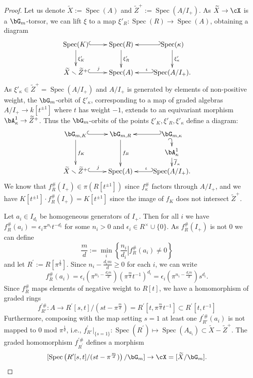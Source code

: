 \documentclass[a4paper]{amsart}
\numberwithin{equation}{section}
\theoremstyle{plain}
\theoremstyle{definition}
\DeclareMathOperator{\Spec}{Spec}
\newcommand{\co}{\colon}
\def\tX{\widetilde{X}}
\def\tZ{\widetilde{Z}}
\begin{document}
\begin{proof}
	Let us denote $\widetilde{X}:=\Spec(A)$ and $\widetilde{Z}^+:=\Spec(A/I_+)$. As $\tX\to \cX$ is a $\bG_m$-torsor, we can lift $\xi$ to a map $\xi'_{R} \co \Spec(R) \to \Spec(A)$, obtaining a diagram
	$$\xymatrix{
		\Spec(K) \ar@{^(->}[r]\ar[d]^{\xi'_K} & \Spec(R)\ar[d]^{\xi'_{R}} & \Spec(\kappa)\ar@{_(->}[l]\ar[d]^{\xi'_{\kappa}} \\
		\tX\smallsetminus\tZ^+ \ar@{^(->}[r]^-{j}& \Spec(A) & \ar@{_(->}[l]_{\iota}\Spec(A/I_+).}$$
	As $\xi'_{\kappa}\in \tZ^+=\Spec(A/I_+)$ and $A/I_+$ is generated by elements of non-positive weight, the $\bG_m$-orbit of $\xi'_{\kappa}$, corresponding to a map of graded algebras $A/I_+ \to k[t^{\pm 1}]$ where $t$ has weight $-1$, extends to an equivariant morphism $\bA^1_{\kappa} \to \tZ^+$. Thus the $\bG_m$-orbits of the points $\xi'_K,\xi'_{R},\xi'_{\kappa}$ define a diagram:
	$$\xymatrix@R=10pt{
		\bG_{m,K} \ar@{^(->}[r]\ar[dd]^{f_K} & \bG_{m,R} \ar[dd]^{f_R} & \bG_{m,{\kappa}}\ar@{_(->}[l]\ar@{_(->}[d] \\
		& & \bA^1_{\kappa} \ar[d]^{\overline{f}_{\kappa}} \\
		\tX\smallsetminus \tZ^+ \ar@{^(->}[r]^-{j}& \Spec(A) & \ar@{_(->}[l]_{\iota}\Spec(A/I_+).}$$
	We know that $f_R^\#(I_+) \in \pi(R[t^{\pm 1}])$ since $f_{\kappa}^\#$ factors through $A/I_+$, and we have $K[t^{\pm 1}]\cdot f_R^\#(I_+)=K[t^{\pm 1}]$ since the image of $f_K$ does not intersect $\tZ^+$.  	
	
	Let $a_i\in I_{d_i}$ be homogeneous generators of $I_+$. Then for all $i$ we have $f_R^{\#}(a_i) =\epsilon_i \pi^{n_i} t^{-d_i}$ for some $n_i > 0$ and $\epsilon_i\in R^\times \cup \{0\}$.  As $f_R^{\#}(I_+)$ is not $0$ we can define
\[
\frac{m}{d}:=\min_i \left\{ \frac{n_i}{d_i} \left| f_R^{\#}(a_i)\neq 0 \right.\right\}
\]
and let $R^\prime:=R[\pi^{\frac{1}{d}}]$. Since $n_i-\frac{d_i m}{d} \geq 0$ for each $i$, we can write 
\[
f_R^{\#}(a_i)=\epsilon_i (\pi^{n_i-\frac{d_i m}{d}}) (\pi^{\frac{m}{d}}t^{-1})^{d_i}= \epsilon_i (\pi^{n_i-\frac{d_i m}{d}}) s^{d_i}.
\]
Since $f^\#_R$ maps elements of negative weight to $R[t]$, we have a homomorphism of graded rings
	$$f_{R'}^{\prime\#}\co A \to R^\prime[s,t]/(st-\pi^{\frac{m}{d}}) = R^\prime[t,\pi^{\frac{m}{d}}t^{-1}]\subset R^\prime[t,t^{-1}]$$ 
Furthermore, composing with the map setting $s=1$ at least one $f_{R'}^{\prime\#}(a_i)$ is not mapped to $0$ mod $\pi^{\frac{1}{d}}$, i.e., $f_{R'}^\prime|_{\{s=1\}} \co \Spec (R^\prime) \mapsto \Spec(A_{a_{i}}) \subset \tX-\tZ^+$.
The graded homomorphism $f^{\prime\#}_{R^\prime}$ defines a morphism 
	$$ [\Spec \left( R^\prime[s,t]/(st-\pi^{\frac{m}{d}}) \right)/\bG_m] \to \cX=[\tX/\bG_m].$$


\end{proof}
\end{document}
